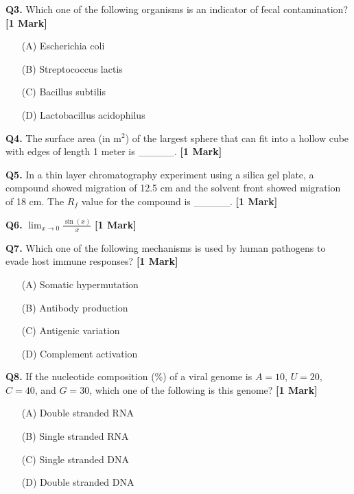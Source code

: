 \documentclass[11pt]{article}
\newcommand{\questiona}[2]{
    \noindent\textbf{Q#2.} #1 \hfill \textbf{[1 Mark]}
}
\begin{document}
\vspace{0.5cm}

\questiona{Which one of the following organisms is an indicator of fecal contamination?}{3}
\begin{enumerate}
    \item[(A)] Escherichia coli
    \item[(B)] Streptococcus lactis  
    \item[(C)] Bacillus subtilis
    \item[(D)] Lactobacillus acidophilus
\end{enumerate}

\vspace{0.5cm}

\questiona{The surface area (in m$^2$) of the largest sphere that can fit into a hollow cube with edges of length 1 meter is \_\_\_\_\_.}{4}

\vspace{0.5cm}

\questiona{In a thin layer chromatography experiment using a silica gel plate, a compound showed migration of 12.5 cm and the solvent front showed migration of 18 cm. The $R_f$ value for the compound is \_\_\_\_\_.}{5}

\vspace{0.5cm}

\questiona{$\lim_{x \to 0} \frac{\sin(x)}{x}$}{6}

\vspace{0.5cm}

\questiona{Which one of the following mechanisms is used by human pathogens to evade host immune responses?}{7}
\begin{enumerate}
    \item[(A)] Somatic hypermutation
    \item[(B)] Antibody production  
    \item[(C)] Antigenic variation
    \item[(D)] Complement activation
\end{enumerate}

\vspace{0.5cm}

\questiona{If the nucleotide composition (\%) of a viral genome is $A = 10$, $U = 20$, $C = 40$, and $G = 30$, which one of the following is this genome?}{8}
\begin{enumerate}
    \item[(A)] Double stranded RNA
    \item[(B)] Single stranded RNA  
    \item[(C)] Single stranded DNA
    \item[(D)] Double stranded DNA
\end{enumerate}
\end{document}
